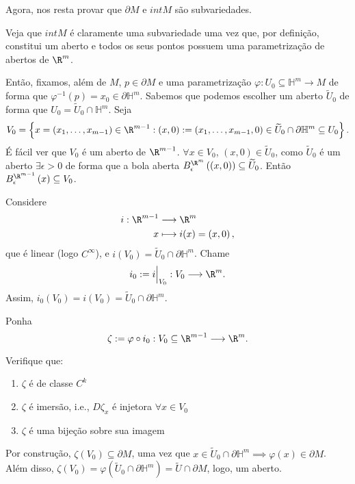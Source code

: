 Agora, nos resta provar que $\partial M$ e $int M$ são subvariedades.

Veja que $int M$ é claramente uma subvariedade uma vez que, por definição, constitui um aberto e todos os seus pontos possuem uma parametrização de abertos de $\R^{m}$.

Então, fixamos, além de $M$, $p \in \partial M$ e uma parametrização $\varphi : U_0\subseteq\mathbb{H}^{m} \longrightarrow M$ de forma que $\varphi ^{-1}\left( p \right) = x_0 \in \partial \mathbb{H}^{m}$. Sabemos que podemos escolher um aberto $\widetilde{U}_0$ de forma que $U_0 = \widetilde{U}_0 \cap \mathbb{H}^{m}$. Seja \[
V_0 = \left\{ x = \left( x_1,\ldots,x_{m-1} \right) \in \R^{m-1} : \left( x, 0 \right) := \left( x_1,\ldots,x_{m-1},0 \right) \in \widetilde{U}_0 \cap \partial \mathbb{H}^{m}  \subseteq U_0 \right\} 
.\] É fácil ver que $V_0$ é um aberto de $\R^{m-1}$. $\forall x \in V_0$, $\left( x,0 \right) \in \widetilde{U}_0$, como $\widetilde{U}_0$ é um aberto $\exists \epsilon>0$ de forma que a bola aberta $B_\epsilon^{\R^{m}}\left( \left( x,0 \right)  \right) \subseteq \widetilde{U}_0$. Então $B_{\epsilon}^{\R^{m-1}}\left( x \right) \subseteq V_0$.

Considere
\begin{align*}
    i:\R^{m-1}  &\longrightarrow \R^{m} \\
    x &\longmapsto i(x) = \left( x,0 \right)  
,\end{align*}
que é linear (logo $C^{\infty}$), e $i\left( V_0 \right) = \widetilde{U}_0 \cap \partial \mathbb{H}^{m}$. Chame \[
i_0:= i\Big|_{V_0}: V_0 \longrightarrow \R^{m}
.\] Assim, $i_0\left( V_0 \right) = i\left( V_0 \right) = \widetilde{U}_0 \cap \partial \mathbb{H}^{m}$.

Ponha \[
\zeta :=\varphi \circ i_0 : V_0\subseteq\R^{m-1} \longrightarrow \R^{m}
.\]
\begin{problem}
    Verifique que:
    \begin{enumerate}
        \item $\zeta$ é de classe $C^{k}$
	\item $\zeta $ é imersão, i.e., $D\zeta_x$ é injetora $\forall x\in V_0$
	\item $\zeta$ é uma bijeção sobre sua imagem
    \end{enumerate}
\end{problem}

    Por construção, $\zeta \left( V_0 \right) \subseteq \partial M$, uma vez que $x \in \widetilde{U}_0 \cap \partial \mathbb{H}^{m}\implies\varphi \left( x \right) \in \partial M $. Além disso, $\zeta \left( V_0 \right) = \varphi \left( \widetilde{U}_0 \cap \partial \mathbb{H}^{m} \right) = \widetilde{U} \cap \partial M$, logo, um aberto. 

